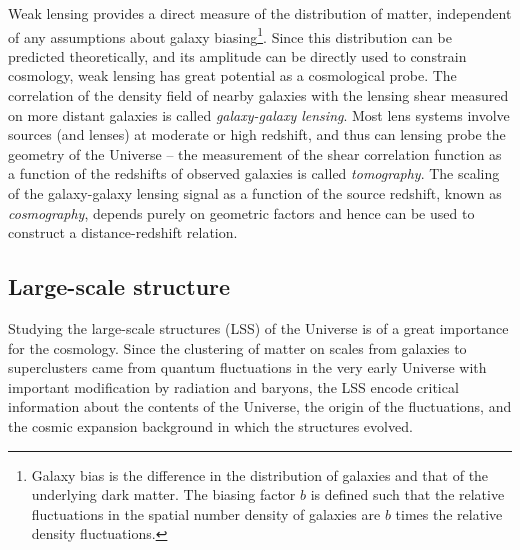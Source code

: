 Weak lensing provides a direct measure of the distribution of matter, independent of any assumptions about galaxy biasing\footnote{Galaxy bias is the difference in the distribution of galaxies and that of the underlying dark matter. The biasing factor $b$ is defined such that the relative fluctuations in the spatial number density of galaxies are $b$ times the relative density fluctuations.}. Since this distribution can be predicted theoretically, and its amplitude can be directly used to constrain cosmology, weak lensing has great potential as a cosmological probe. The correlation of the density field of nearby galaxies with the lensing shear measured on more distant galaxies is called \textit{galaxy-galaxy lensing}. Most lens systems involve sources (and lenses) at moderate or high redshift, and thus can lensing probe the geometry of the Universe -- the measurement of the shear correlation function as a function of the redshifts of observed galaxies is called \textit{tomography}. The scaling of the galaxy-galaxy lensing signal as a function of the source redshift, known as \textit{cosmography}, depends purely on geometric factors and hence can be used to construct a distance-redshift relation.
\subsection{Large-scale structure}
Studying the large-scale structures (LSS) of the Universe is of a great importance for the cosmology. Since the clustering of matter on scales from galaxies to superclusters came from quantum fluctuations in the very early Universe with important modification by radiation and baryons, the LSS encode critical information about the contents of the Universe, the origin of the fluctuations, and the cosmic expansion background in which the structures evolved.

